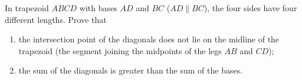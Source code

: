 In trapezoid $ABCD$ with bases $AD$ and $BC$ ($AD\parallel BC$), the four sides have four different lengths. Prove that
\begin{enumerate}
\item[(1)] the intersection point of the diagonals does not lie on the midline of the trapezoid (the segment joining the midpoints of the legs $AB$ and $CD$);
\item[(2)] the sum of the diagonals is greater than the sum of the bases.
\end{enumerate}
